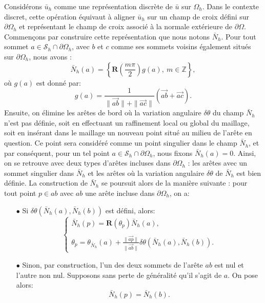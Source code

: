 Considérons $\bar{u}_h$ comme une représentation discrète de $\bar{u}$ sur $\Omega_h$. Dans le contexte discret, cette opération équivaut à aligner $\bar{u}_h$ sur un champ de croix défini sur $\partial\Omega_h$ et représentant le champ de croix associé à la normale extérieure de $\partial\Omega$. Commençons par construire cette représentation que nous notons $\bar{N}_h$. Pour tout sommet $a\in\mathcal{S}_h\cap\partial\Omega_h$, avec $b$ et $c$ comme ses sommets voisins également situés sur $\partial\Omega_h$, nous avons :
\begin{equation}
\bar{N}_h(a)=\displaystyle\left\{\mathbf{R}\left(\frac{m\pi}{2}\right)g(a),~ m\in\mathbb{Z}\right\},
\end{equation}
où $g(a)$ est donné par:
\begin{equation}
g(a)=\displaystyle\frac{1}{\|\overrightarrow{ab}\|+\|\overrightarrow{ac}\|}\left(\overrightarrow{ab}+\overrightarrow{ac}\right).
\end{equation}
Ensuite, on élimine les arêtes de bord où la variation angulaire $\delta\theta$ du champ $\bar{N}_h$ n'est pas définie, soit en effectuant un raffinement local ou global du maillage, soit en insérant dans le maillage un nouveau point situé au milieu de l'arête en question. Ce point sera considéré comme un point singulier dans le champ $\bar{N}_h$, et par conséquent, pour un tel point $a\in\mathcal{S}_h\cap\partial\Omega_h$, nous fixons $\bar{N}_h(a)=0$. Ainsi, on se retrouve avec deux types d'arêtes incluses dans $\partial\Omega_h$ : les arêtes avec un sommet singulier dans $\bar{N}_h$ et les arêtes où la variation angulaire $\delta\theta$ de $\bar{N}_h$ est bien définie. La construction de $\bar{N}_h$ se poursuit alors de la manière suivante : pour tout point $p\in ab$ avec $ab$ une arête incluse dans $\partial\Omega_h$, on a:\\
\begin{itemize}
\item[$\bullet$] Si $\delta\theta(\bar{N}_h(a), \bar{N}_h(b))$ est défini, alors:
 $$
 \left\{
 \begin{array}{l}
 \bar{N}_h(p)=\mathbf{R}(\theta_p)\bar{N}_h(a),\\\\
 \theta_p = \theta_{\bar{N}_h}(a)+\displaystyle\frac{\|\overrightarrow{ap}\|}{\|\overrightarrow{ab}\|}\delta\theta(\bar{N}_h(a), \bar{N}_h(b)).
 \end{array}
 \right.
 $$
 \item[$\bullet$] Sinon, par construction, l'un des deux sommets de l'arête $ab$ est nul et l'autre non nul. Supposons sans perte de généralité qu'il s'agit de $a$. On pose alors:
 $$
 \bar{N}_h(p)=\bar{N}_h(b).
 $$
\end{itemize}
